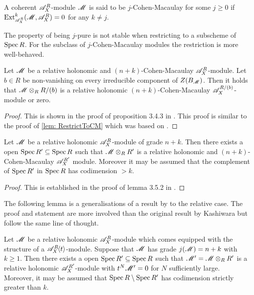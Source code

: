\begin{definition}
  A coherent $\mathscr{A}_X^R$-module $\mathscr{M}$ is said to be $j$-Cohen-Macaulay for some $j\geq 0$ if $\Ex{\A_X^R}{k}(\M,\A_X^R) = 0$ for any $k\neq j$.
\end{definition}
The property of being $j$-pure is not stable when restricting to a subscheme of $\operatorname{Spec} R$.
For the subclass of $j$-Cohen-Macaulay modules the restriction is more well-behaved.
\begin{lemma}\label{lem: CMLemmaBudur}
  Let $\mathscr{M}$ be a relative holonomic and $(n+k)$-Cohen-Macaulay $\mathscr{A}_X^R$-module. Let $b\in R$ be non-vanishing on every irreducible component of $Z(B_{\mathscr{M}})$. Then it holds that $\mathscr{M}\otimes_R R/(b)$ is a relative holonomic $(n+k)$-Cohen-Macaulay $\mathscr{A}_X^{R/(b)}$-module or zero.
\end{lemma}
\begin{proof}
  This is shown in the proof of proposition 3.4.3 in \cite{budur2019zero}. This proof is similar to the proof of \cref{lem: RestrictToCM} which was based on \cite{budur2019zero}.
\end{proof}
\begin{lemma}\label{lem: GradeToCMOverOpen}
  Let $\mathscr{M}$ be a relative holonomic $\mathscr{A}_X^R$-module of grade $n+k$. Then there exists a open $\operatorname{Spec} R' \subseteq \operatorname{Spec} R$ such that $\mathscr{M}\otimes_R R'$ is a relative holonomic and $(n+k)$-Cohen-Macaulay $\mathscr{A}_X^{R'}$ module. Moreover it may be assumed that the complement of $\operatorname{Spec} R'$ in $\operatorname{Spec} R$ has codimension $>k$.
\end{lemma}
\begin{proof}
  This is established in the proof of lemma 3.5.2 in \cite{budur2019zero}.
\end{proof}
The following lemma is a generalisations of a result by \cite{kashiwara1976b} to the relative case.
The proof and statement are more involved than the original result by Kashiwara but follow the same line of thought.
\begin{lemma}\label{lem: StabilisationtN}
  Let $\mathscr{M}$ be a relative holonomic $\mathscr{A}_X^R$-module which comes equipped with the structure of a $\mathscr{A}_X^R\mkern-5mu\left\langle t \right\rangle$-module.
  Suppose that $\mathscr{M}$ has grade $j(\mathscr{M}) = n+k$ with $k\geq 1$.
  Then there exists a open $\operatorname{Spec} R' \subseteq \operatorname{Spec} R$ such that $\mathscr{M}' = \mathscr{M} \otimes_{R} R'$ is a relative holonomic $\mathscr{A}_X^{R'}$-module with $t^N \mathscr{M}' = 0$ for $N$ sufficiently large. Moreover, it may be assumed that $\operatorname{Spec} R \setminus \operatorname{Spec} R'$ has codimension strictly greater than $k$.
\end{lemma}
